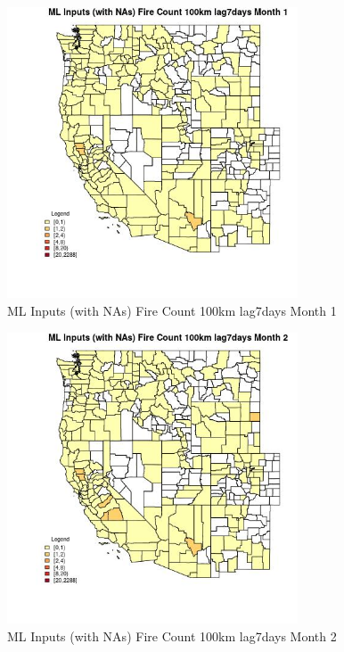 \clearpage 

\begin{figure} 
\centering  
\includegraphics[width=0.77\textwidth]{Code_Outputs/Report_ML_input_PM25_Step4_part_e_de_duplicated_aves_compiled_2019-05-20wNAs_CountyFire_Count_100km_lag7daysmedianMonth1.jpg} 
\caption{\label{fig:Report_ML_input_PM25_Step4_part_e_de_duplicated_aves_compiled_2019-05-20wNAsCountyFire_Count_100km_lag7daysmedianMonth1}ML Inputs (with NAs) Fire Count 100km lag7days Month 1} 
\end{figure} 
 

\begin{figure} 
\centering  
\includegraphics[width=0.77\textwidth]{Code_Outputs/Report_ML_input_PM25_Step4_part_e_de_duplicated_aves_compiled_2019-05-20wNAs_CountyFire_Count_100km_lag7daysmedianMonth2.jpg} 
\caption{\label{fig:Report_ML_input_PM25_Step4_part_e_de_duplicated_aves_compiled_2019-05-20wNAsCountyFire_Count_100km_lag7daysmedianMonth2}ML Inputs (with NAs) Fire Count 100km lag7days Month 2} 
\end{figure} 
 

